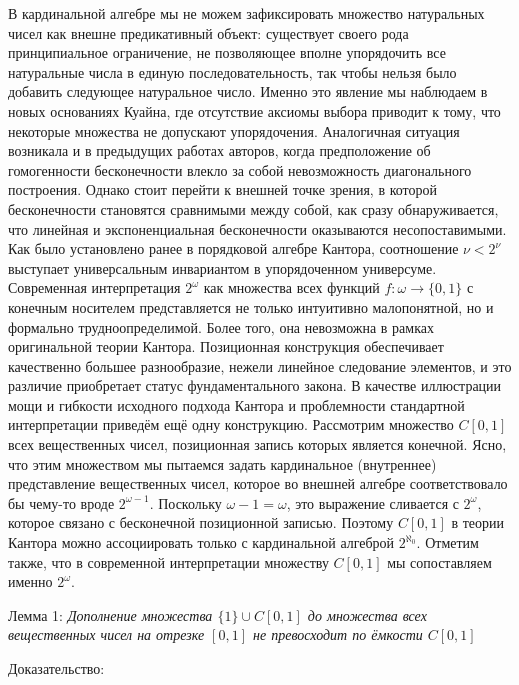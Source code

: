 \documentclass[12pt]{article}
\begin{document}
В кардинальной алгебре мы не можем зафиксировать множество натуральных чисел как внешне предикативный объект: существует своего рода принципиальное ограничение, не позволяющее вполне упорядочить все натуральные числа в единую последовательность, так чтобы нельзя было добавить следующее натуральное число. Именно это явление мы наблюдаем в новых основаниях Куайна, где отсутствие аксиомы выбора приводит к тому, что некоторые множества не допускают упорядочения. Аналогичная ситуация возникала и в предыдущих работах авторов, когда предположение об гомогенности бесконечности влекло за собой невозможность диагонального построения. Однако стоит перейти к внешней точке зрения, в которой бесконечности становятся сравнимыми между собой, как сразу обнаруживается, что линейная и экспоненциальная бесконечности оказываются несопоставимыми. Как было установлено ранее в порядковой алгебре Кантора, соотношение $\nu < 2^{\nu}$ выступает универсальным инвариантом в упорядоченном универсуме. Современная интерпретация $2^{\omega}$ как множества всех функций $f : \omega \to \{0, 1\}$ с конечным носителем представляется не только интуитивно малопонятной, но и формально трудноопределимой. Более того, она невозможна в рамках оригинальной теории Кантора. Позиционная конструкция обеспечивает качественно большее разнообразие, нежели линейное следование элементов, и это различие приобретает статус фундаментального закона. В качестве иллюстрации мощи и гибкости исходного подхода Кантора и проблемности стандартной интерпретации приведём ещё одну конструкцию. Рассмотрим множество $C[0, 1]$ всех вещественных чисел, позиционная запись которых является конечной. Ясно, что этим множеством мы пытаемся задать кардинальное (внутреннее) представление вещественных чисел, которое во внешней алгебре соответствовало бы чему-то вроде $2^{\omega - 1}$. Поскольку $\omega - 1 = \omega$, это выражение сливается с $2^{\omega}$, которое связано с бесконечной позиционной записью. Поэтому $C[0, 1]$ в теории Кантора можно ассоциировать только с кардинальной алгеброй $2^{\aleph_0}$. Отметим также, что в современной интерпретации множеству $C[0, 1]$ мы сопоставляем именно $2^{\omega}$. 

Лемма 1: {\sl Дополнение множества $\{1\} \cup C[0, 1]$ до множества всех вещественных чисел на отрезке $[0, 1]$ не превосходит по ёмкости $C[0, 1]$}

Доказательство: 
\end{document}
